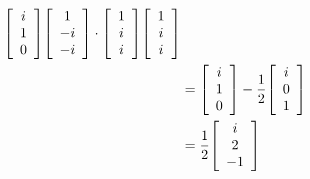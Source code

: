 \documentclass[11pt, a4paper, norsk]{NTNUoving}
\newenvironment{matrise}[1][c]{
        \left[
            \begin{array}{#1}
    }
    {    
    \end{array}
    \right]           
}
\begin{document}
\begin{oppgave}
\begin{punkt}
\begin{align*}
{\begin{matrise}[c]
            i\\1\\0
            \end{matrise}}{\begin{matrise}[c]
            1\\-i\\-i
            \end{matrise}\cdot \begin{matrise}[c]
            1\\i\\i
            \end{matrise}}\begin{matrise}[c]
            1\\i\\i
            \end{matrise}
            \\&=\begin{matrise}
                i\\1\\0
            \end{matrise}
            -\frac{1}{2} \begin{matrise}[c]
            i\\0\\1
            \end{matrise}
            \\&=\frac{1}{2}\begin{matrise}
            i\\2\\-1
            \end{matrise}
        \end{align*}
    \end{punkt}
\end{oppgave}
\end{document}
